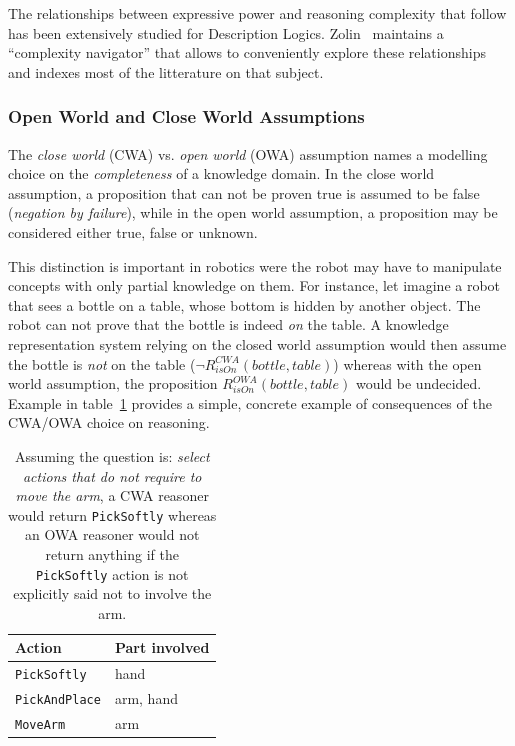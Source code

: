 \documentclass[a4paper, twocolumn]{article}
\begin{document}
The relationships between expressive power and reasoning complexity that follow
has been extensively studied for Description Logics.
Zolin~\cite{ZolinDLComplexityNavigator} maintains a ``complexity navigator''
that allows to conveniently explore these relationships and indexes most of the
litterature on that subject.

\subsubsection{Open World and Close World Assumptions}

The \emph{close world} (CWA) vs. \emph{open world} (OWA) assumption names a
modelling choice on the \emph{completeness} of a knowledge domain. In the close
world assumption, a proposition that can not be proven true is assumed to be
false (\emph{negation by failure}), while in the open world assumption, a
proposition may be considered either true, false or unknown.

This distinction is important in robotics were the robot may have to manipulate
concepts with only partial knowledge on them. For instance, let imagine a robot
that sees a bottle on a table, whose bottom is hidden by another object. The
robot can not prove that the bottle is indeed \emph{on} the table. A knowledge
representation system relying on the closed world assumption would then assume
the bottle is \emph{not} on the table ($\lnot R^{CWA}_{isOn}(bottle, table)$)
whereas with the open world assumption, the proposition $R^{OWA}_{isOn}(bottle,
table)$ would be undecided. Example in table~\ref{table|cwa-owa-example} provides
a simple, concrete example of consequences of the CWA/OWA choice on reasoning.

\begin{table}
	\begin{center}
	\begin{tabular}{ll}
	{\bf Action} & {\bf Part involved} \\
	\hline
	{\tt PickSoftly} & hand \\
	{\tt PickAndPlace} & arm, hand \\
	{\tt MoveArm} & arm \\
	\hline
	\end{tabular}
	\end{center}
	\caption{Assuming the question is: \emph{select actions that do not require
	to move the arm}, a CWA reasoner would return {\tt PickSoftly} whereas an
	OWA reasoner would not return anything if the {\tt PickSoftly} action is
	not explicitly said not to involve the arm.}
	\label{table|cwa-owa-example}
\end{table}
\end{document}
